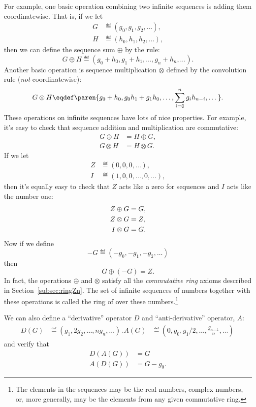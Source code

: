 For example, one basic operation combining two infinite sequences is
adding them coordinatewise.  That is, if we let
\begin{align*}
G & \eqdef (g_0,g_1,g_2,\dots),\\
H & \eqdef (h_0,h_1,h_2,\dots),
\end{align*}
then we can define the sequence sum $\oplus$ by the rule:
\[
G \oplus H \eqdef (g_0+h_0, g_1+h_1, \dots, g_n+h_n, \dots).
\]
Another basic operation is sequence multiplication $\otimes$ defined
by the convolution rule (\emph{not} coordinatewise):
\[
G \otimes H \eqdef \paren{g_0+h_0, g_0h_1+g_1h_0, \dots, \sum_{i=0}^n g_ih_{n-i}, \dots}.
\]
These operations on infinite sequences have lots of nice properties.
For example, it's easy to check that sequence addition and
multiplication are commutative:
\begin{align*}
G \oplus H & = H \oplus G,\\
G \otimes H & = H \otimes G.
\end{align*}
If we let
\begin{align*}
Z & \eqdef (0,0,0,\dots),\\
I & \eqdef (1,0,0,\dots,0,\dots),
\end{align*}
then it's equally easy to check that $Z$ acts like a zero for
sequences and $I$ acts like the number one:
\begin{align}
Z \oplus G & = G,\notag\\
Z \otimes G & = Z,\label{ZoGZ}\\
I \otimes G & = G.\notag
\end{align}
Now if we define
\[
-G \eqdef (-g_0, -g_1, -g_2,\dots)
\]
then
\[
G \oplus (-G) = Z.
\]
In fact, the operations $\oplus$ and $\otimes$ satisfy all the
\emph{commutative ring} axioms described in
Section~\ref{subsec:ringZn}.  The set of infinite sequences of
numbers together with these operations is called the ring of
over these numbers.\footnote{The elements in
  the sequences may be the real numbers, complex numbers, or, more
  generally, may be the elements from any given commutative ring.}

\begin{editingnotes}
We can also define a ``derivative'' operator $D$ and
``anti-derivative'' operator, $A$:
\begin{align*}
D(G) & \eqdef (g_1, 2g_2, \dots, ng_{n},\dots)\, .
A(G) & \eqdef (0, g_0, g_1/2, \dots, \frac{g_{n-1}}{n}, \dots)\,
\end{align*}
and verify that
\begin{align*}
D(A(G)) & = G\\
A(D(G)) & = G - g_0.
\end{align*}
\end{editingnotes}

